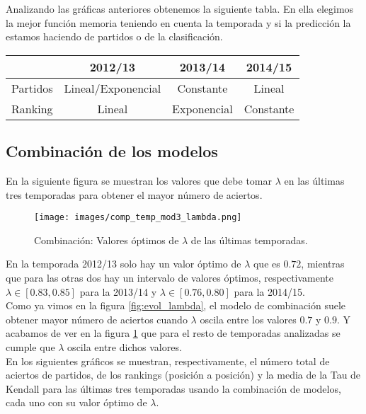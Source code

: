 Analizando las gráficas anteriores obtenemos la siguiente tabla. En ella elegimos la mejor función memoria teniendo en cuenta la temporada y si la predicción la estamos haciendo de partidos o de la clasificación.

\begin{center}
	\begin{tabular}{|c|c|c|c|}
		\hline &  2012/13 &  2013/14 &  2014/15 \\ 
		\hline Partidos & Lineal/Exponencial &  Constante &  Lineal \\ 
		\hline Ranking  &  Lineal &  Exponencial &  Constante \\ 
		\hline 
	\end{tabular} 
\end{center}

\subsection{Combinación de los modelos}
En la siguiente figura se muestran los valores que debe tomar $\lambda$ en las últimas tres temporadas para obtener el mayor número de aciertos.

\begin{figure}[H]
	\centering
	\texttt{[image: images/comp\_temp\_mod3\_lambda.png]}
	\caption{Combinación: Valores óptimos de $\lambda$ de las últimas temporadas.} \label{fig:lambda_temp}
\end{figure}

En la temporada 2012/13 solo hay un valor óptimo de $\lambda$ que es $0.72$, mientras que para las otras dos hay un intervalo de valores óptimos, respectivamente $\lambda \in [0.83,0.85]$ para la 2013/14 y $\lambda \in [0.76,0.80]$ para la 2014/15.\\

Como ya vimos en la figura \ref{fig:evol_lambda}, el modelo de combinación suele obtener mayor número de aciertos cuando $\lambda$ oscila entre los valores $0.7$ y $0.9$. Y acabamos de ver en la figura \ref{fig:lambda_temp} que para el resto de temporadas analizadas se cumple que $\lambda$ oscila entre dichos valores. \\

En los siguientes gráficos se muestran, respectivamente, el número total de aciertos de partidos, de los rankings (posición a posición) y la media de la Tau de Kendall para las últimas tres temporadas usando la combinación de modelos, cada uno con su valor óptimo de $\lambda$.

